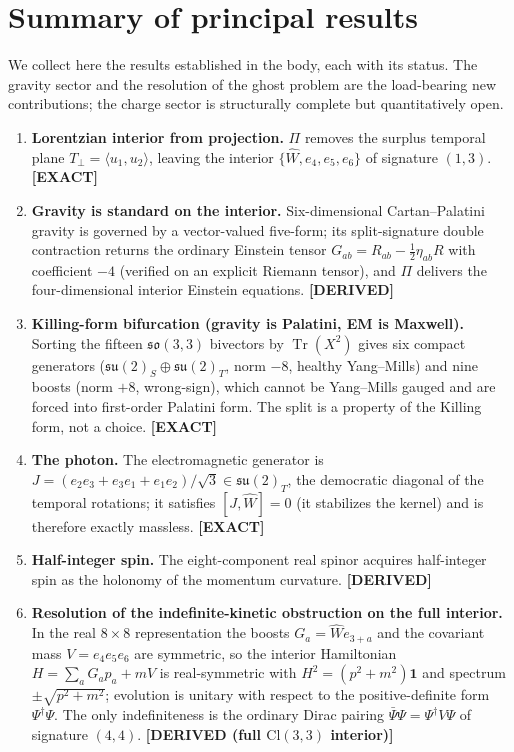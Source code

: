 \documentclass[11pt,oneside]{book}
\newcommand{\Wh}{\hat{W}}                         %
\newcommand{\Cl}{\mathrm{Cl}}                     %
\newcommand{\Tr}{\operatorname{Tr}}
\newcommand{\su}{\mathfrak{su}}
\newcommand{\so}{\mathfrak{so}}
\newcommand{\status}[1]{{\sffamily\bfseries\color{statuscol}[#1]}}
\theoremstyle{plain}
\theoremstyle{definition}
\theoremstyle{remark}
\begin{document}
\section{Summary of principal results}
\label{sec:summary}

We collect here the results established in the body, each with its status. The
gravity sector and the resolution of the ghost problem are the load-bearing new
contributions; the charge sector is structurally complete but quantitatively open.

\begin{enumerate}[leftmargin=1.4em,itemsep=3pt]
\item \textbf{Lorentzian interior from projection.} $\Pi$ removes the surplus
temporal plane $T_\perp=\langle u_1,u_2\rangle$, leaving the interior
$\{\Wh,e_4,e_5,e_6\}$ of signature $(1,3)$. \status{EXACT}

\item \textbf{Gravity is standard on the interior.} Six-dimensional
Cartan--Palatini gravity is governed by a vector-valued five-form; its
split-signature double contraction returns the ordinary Einstein tensor
$G_{ab}=R_{ab}-\tfrac12\eta_{ab}R$ with coefficient $-4$ (verified on an explicit
Riemann tensor), and $\Pi$ delivers the four-dimensional interior Einstein
equations.
\status{DERIVED}

\item \textbf{Killing-form bifurcation (gravity is Palatini, EM is Maxwell).}
Sorting the fifteen $\so(3,3)$ bivectors by $\Tr(X^2)$ gives six compact
generators ($\su(2)_S\oplus\su(2)_T$, norm $-8$, healthy Yang--Mills) and nine
boosts (norm $+8$, wrong-sign), which cannot be Yang--Mills gauged and are forced
into first-order Palatini form. The split is a property of the Killing form, not a
choice. \status{EXACT}

\item \textbf{The photon.} The electromagnetic generator is
$J=(e_2e_3+e_3e_1+e_1e_2)/\sqrt3\in\su(2)_T$, the democratic diagonal of the
temporal rotations; it satisfies $[J,\Wh]=0$ (it stabilizes the kernel) and is
therefore exactly massless. \status{EXACT}

\item \textbf{Half-integer spin.} The eight-component real spinor acquires
half-integer spin as the holonomy of the momentum curvature. \status{DERIVED}

\item \textbf{Resolution of the indefinite-kinetic obstruction on the full
interior.} In the real $8\times8$ representation the boosts $G_a=\Wh e_{3+a}$ and
the covariant mass $V=e_4e_5e_6$ are symmetric, so the interior Hamiltonian
$H=\sum_a G_a p_a+mV$ is real-symmetric with $H^2=(p^2+m^2)\mathbf 1$ and spectrum
$\pm\sqrt{p^2+m^2}$; evolution is unitary with respect to the positive-definite
form $\Psi^\dagger\Psi$. The only indefiniteness is the ordinary Dirac pairing
$\bar\Psi\Psi=\Psi^\dagger V\Psi$ of signature $(4,4)$. \status{DERIVED (full $\Cl(3,3)$ interior)}


\end{enumerate}
\end{document}
